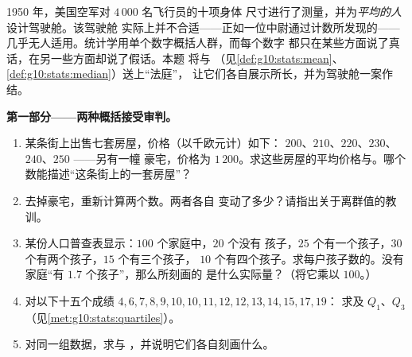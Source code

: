 \begin{problem}
\label{pb:g10:stats:1}
1950 年，美国空军对 $4\,000$ 名飞行员的十项身体
尺寸进行了测量，并为\emph{平均的人}设计驾驶舱。该驾驶舱
实际上并不合适——正如一位中尉通过计数所发现的——
几乎无人适用。统计学用单个数字概括人群，而每个数字
都只在某些方面说了真话，在另一些方面却说了假话。本题
将与
（见\cref{def:g10:stats:mean}、\cref{def:g10:stats:median}）送上“法庭”，
让它们各自展示所长，并为驾驶舱一案作结。

\medskip
\noindent\textbf{第一部分——两种概括接受审判。}
\begin{enumerate}
  \item 某条街上出售七套房屋，价格（以千欧元计）如下：
        $200$、$210$、$220$、$230$、$240$、$250$ ——另有一幢
        豪宅，价格为 $1\,200$。求这些房屋的平均价格与。哪个数能描述“这条街上的一套房屋”？
  \item 去掉豪宅，重新计算两个数。两者各自
        变动了多少？请指出关于离群值的教训。
  \item 某份人口普查表显示：$100$ 个家庭中，$20$ 个没有
        孩子，$25$ 个有一个孩子，$30$ 个有两个孩子，$15$ 个有三个孩子，
        $10$ 个有四个孩子。求每户孩子数的。没有
        家庭“有 $1.7$ 个孩子”，那么所刻画的
        是什么实际量？（将它乘以 $100$。）
  \item 对以下十五个成绩
        $4, 6, 7, 8, 9, 10, 10, 11, 12, 12, 13, 14, 15, 17, 19$：
        求及 $Q_1$、$Q_3$
        （见\cref{met:g10:stats:quartiles}）。
  \item 对同一组数据，求与
        ，并说明它们各自刻画什么。
\end{enumerate}


\end{problem}
